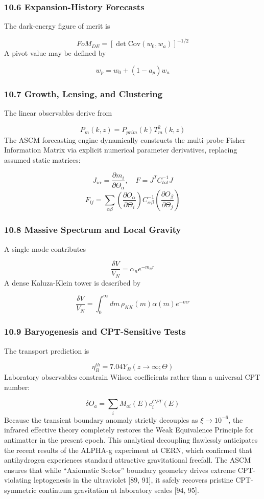\documentclass[aps,prd,onecolumn,superscriptaddress,nofootinbib,longbibliography,10pt]{revtex4-2}
\begin{document}
  
\subsubsection*{10.6 Expansion-History Forecasts}

  The dark-energy figure of merit is


  \[ FoM_{DE} = [\det\text{Cov}(w_0, w_a)]^{-1/2} \]
  A pivot value may be defined by


  \[ w_p = w_0 + (1 - a_p)w_a \]

  
\subsubsection*{10.7 Growth, Lensing, and Clustering}

  The linear observables derive from


  \[ P_m(k,z) = P_{prim}(k) T_m^2(k,z) \]
  The ASCM forecasting engine dynamically constructs the multi-probe Fisher Information Matrix via explicit numerical parameter derivatives, replacing assumed static matrices:


  \[ J_{i\alpha} = \frac{\partial m_i}{\partial\Theta_\alpha}, \quad F = J^T C_{tot}^{-1} J \]
  \[ F_{ij} = \sum_{\alpha\beta} \left(\frac{\partial O_\alpha}{\partial\Theta_i}\right) C_{\alpha\beta}^{-1} \left(\frac{\partial O_\beta}{\partial\Theta_j}\right) \]

  
\subsubsection*{10.8 Massive Spectrum and Local Gravity}

  A single mode contributes


  \[ \frac{\delta V}{V_N} = \alpha_n e^{-m_n r} \]
  A dense Kaluza-Klein tower is described by


  \[ \frac{\delta V}{V_N} = \int_0^\infty dm\, \rho_{KK}(m)\alpha(m) e^{-mr} \]

  
\subsubsection*{10.9 Baryogenesis and CPT-Sensitive Tests}

  The transport prediction is


  \[ \eta_B^{th} = 7.04 Y_B(z \to \infty; \Theta) \]
  Laboratory observables constrain Wilson coefficients rather than a universal CPT number:


  \[ \delta O_a = \sum_i M_{ai}(E) c_i^{CPT}(E) \]
Because the transient boundary anomaly strictly decouples as \(\xi \to 10^{-6}\), the infrared effective theory completely restores the Weak Equivalence Principle for antimatter in the present epoch. This analytical decoupling flawlessly anticipates the recent results of the ALPHA-g experiment at CERN, which confirmed that antihydrogen experiences standard attractive gravitational freefall. The ASCM ensures that while ``Axiomatic Sector'' boundary geometry drives extreme CPT-violating leptogenesis in the ultraviolet [89, 91], it safely recovers pristine CPT-symmetric continuum gravitation at laboratory scales [94, 95].
\end{document}
